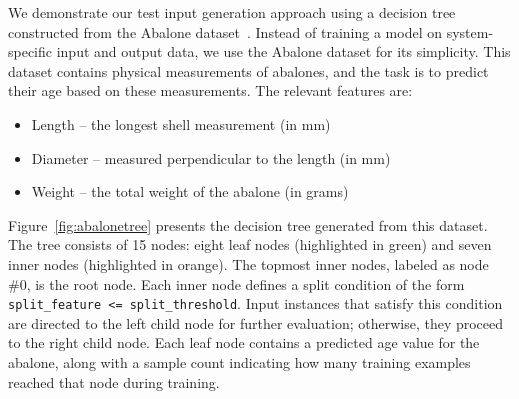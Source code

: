 \documentclass[
]{ceurart}
\theoremstyle{definition}
\begin{document}
We demonstrate our test input generation approach using a decision tree constructed from the Abalone dataset~\cite{abalone}. Instead of training a model on system-specific input and output data, we use the Abalone dataset for its simplicity. This dataset contains physical measurements of abalones, and the task is to predict their age based on these measurements. The relevant features are:
\begin{itemize}
\item Length -- the longest shell measurement (in mm)
\item Diameter -- measured perpendicular to the length (in mm)
\item Weight -- the total weight of the abalone (in grams)
\end{itemize}
Figure~\ref{fig:abalonetree} presents the decision tree generated from this dataset. The tree consists of 15 nodes: eight leaf nodes (highlighted in green) and seven inner nodes (highlighted in orange). The topmost inner nodes, labeled as node \#0, is the root node. Each inner node defines a split condition of the form \lstinline{split_feature <= split_threshold}. Input instances that satisfy this condition are directed to the left child node for further evaluation; otherwise, they proceed to the right child node. Each leaf node contains a predicted age value for the abalone, along with a sample count indicating how many training examples reached that node during training.
\end{document}
